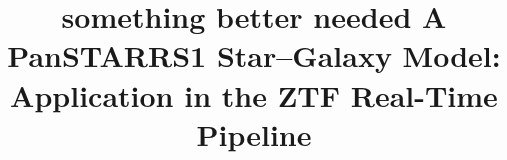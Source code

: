 \documentclass[twocolumn, dvipdfmx]{aastex62}
\begin{document}
\title{\textbf{something better needed} A PanSTARRS1 Star--Galaxy Model: Application in the ZTF Real-Time Pipeline}


\end{document}
